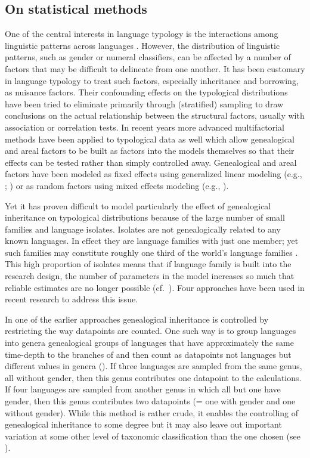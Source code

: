 \documentclass[output=collectionpaper]{langsci/langscibook}
\begin{document}
\subsection{On statistical methods}
\label{sec:Sinne:3.2}

One of the central interests in language typology is the interactions among linguistic patterns across languages \citep{Bickel2007a}. However, the distribution of linguistic patterns, such as gender or numeral classifiers, can be affected by a number of factors that may be difficult to delineate from one another. It has been customary in language typology to treat such factors, especially inheritance and borrowing, as nuisance factors. Their confounding effects on the typological distributions have been tried to eliminate primarily through (stratified) sampling to draw conclusions on the actual relationship between the structural factors, usually with association or correlation tests. In recent years more advanced multifactorial methods have been applied to typological data as well which allow genealogical and areal factors to be built as factors into the models themselves so that their effects can be tested rather than simply controlled away. Genealogical and areal factors have been modeled as fixed effects using generalized linear modeling (e.g., \citealt{Cysouw2010}; \citealt{Sinnemaeki2010}) or as random factors using mixed effects modeling (e.g., \citealt{Bentz2013}).

Yet it has proven difficult to model particularly the effect of genealogical inheritance on typological distributions because of the large number of small families and language isolates. Isolates are not genealogically related to any known languages. In effect they are language families with just one member; yet such families may constitute roughly one third of the world's language families \citep{Campbell2016}. This high proportion of isolates means that if language family is built into the research design, the number of parameters in the model increases so much that reliable estimates are no longer possible (cf.\ \citealt[877--880]{Sinnemaeki2010}). Four approaches have been used in recent research to address this issue.

In one of the earlier approaches genealogical inheritance is controlled by restricting the way datapoints are counted. One such way is to group languages into genera \textendash{} genealogical groups of languages that have approximately the same time-depth to the branches of  \textendash{} and then count as datapoints not languages but different values in genera (\citealt{Dryer1992,Dryer2000}). If three languages are sampled from the same genus, all without gender, then this genus contributes one datapoint to the calculations. If four languages are sampled from another genus in which all but one have gender, then this genus contributes two datapoints (= one with gender and one without gender). While this method is rather crude, it enables the controlling of genealogical inheritance to some degree but it may also leave out important variation at some other level of taxonomic classification than the one chosen (see \citealt{Bickel2008}).
\end{document}
